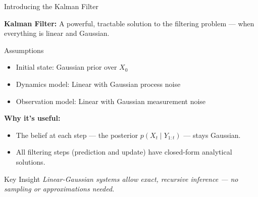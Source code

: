 \documentclass[handout,aspectratio=169]{beamer}
\begin{document}
\begin{frame}{Introducing the Kalman Filter}

\textbf{Kalman Filter:} A powerful, tractable solution to the filtering problem — when everything is linear and Gaussian.


\begin{block}{Assumptions}
\begin{itemize}
  \item Initial state: Gaussian prior over \( X_0 \)
  \item Dynamics model: Linear with Gaussian process noise
  \item Observation model: Linear with Gaussian measurement noise
\end{itemize}
\end{block}


\textbf{Why it's useful:}
\begin{itemize}
  \item The belief at each step — the posterior \( p(X_t \mid Y_{1:t}) \) — stays Gaussian.
  \item All filtering steps (prediction and update) have closed-form analytical solutions.
\end{itemize}


\begin{block}{Key Insight}
\textit{Linear-Gaussian systems allow exact, recursive inference — no sampling or approximations needed.}
\end{block}

\end{frame}
\end{document}
